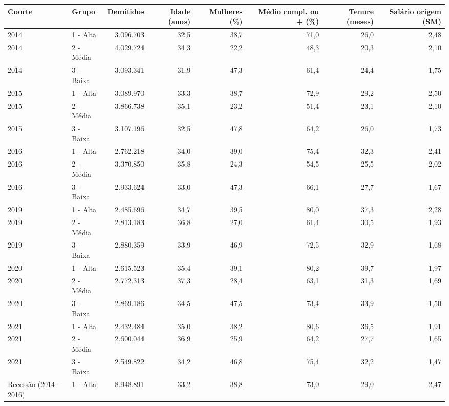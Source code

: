 \providecommand{\toprule}{\hline\hline}
\providecommand{\midrule}{\hline}
\providecommand{\bottomrule}{\hline\hline}
\providecommand{\addlinespace}[1][]{}
{\small
\renewcommand{\arraystretch}{1.12}
\begin{tabular}{llrrrrrr}
\toprule
Coorte & Grupo & Demitidos & Idade (anos) & Mulheres (\%) & Médio compl. ou + (\%) & Tenure (meses) & Salário origem (SM) \\
\midrule
2014 & 1 - Alta & 3.096.703 & 32,5 & 38,7 & 71,0 & 26,0 & 2,48 \\
2014 & 2 - Média & 4.029.724 & 34,3 & 22,2 & 48,3 & 20,3 & 2,10 \\
2014 & 3 - Baixa & 3.093.341 & 31,9 & 47,3 & 61,4 & 24,4 & 1,75 \\
\addlinespace[3pt]
2015 & 1 - Alta & 3.089.970 & 33,3 & 38,7 & 72,9 & 29,2 & 2,50 \\
2015 & 2 - Média & 3.866.738 & 35,1 & 23,2 & 51,4 & 23,1 & 2,10 \\
2015 & 3 - Baixa & 3.107.196 & 32,5 & 47,8 & 64,2 & 26,0 & 1,73 \\
\addlinespace[3pt]
2016 & 1 - Alta & 2.762.218 & 34,0 & 39,0 & 75,4 & 32,3 & 2,41 \\
2016 & 2 - Média & 3.370.850 & 35,8 & 24,3 & 54,5 & 25,5 & 2,02 \\
2016 & 3 - Baixa & 2.933.624 & 33,0 & 47,3 & 66,1 & 27,7 & 1,67 \\
\addlinespace[3pt]
2019 & 1 - Alta & 2.485.696 & 34,7 & 39,5 & 80,0 & 37,3 & 2,28 \\
2019 & 2 - Média & 2.813.183 & 36,8 & 27,0 & 61,4 & 30,5 & 1,93 \\
2019 & 3 - Baixa & 2.880.359 & 33,9 & 46,9 & 72,5 & 32,9 & 1,68 \\
\addlinespace[3pt]
2020 & 1 - Alta & 2.615.523 & 35,4 & 39,1 & 80,2 & 39,7 & 1,97 \\
2020 & 2 - Média & 2.772.313 & 37,3 & 28,4 & 63,1 & 31,3 & 1,69 \\
2020 & 3 - Baixa & 2.869.186 & 34,5 & 47,5 & 73,4 & 33,9 & 1,50 \\
\addlinespace[3pt]
2021 & 1 - Alta & 2.432.484 & 35,0 & 38,2 & 80,6 & 36,5 & 1,91 \\
2021 & 2 - Média & 2.600.044 & 36,9 & 25,9 & 64,2 & 27,7 & 1,65 \\
2021 & 3 - Baixa & 2.549.822 & 34,2 & 46,8 & 75,4 & 32,2 & 1,47 \\
\addlinespace[3pt]
Recessão (2014–2016) & 1 - Alta & 8.948.891 & 33,2 & 38,8 & 73,0 & 29,0 & 2,47 \\

\end{tabular}}
